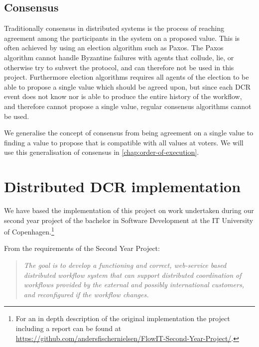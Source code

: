 		
		\subsection{Consensus}
		Traditionally consensus in distributed systems is the process of reaching agreement among the participants in the system on a proposed value. This is often achieved by using an election algorithm such as Paxos\cite{Lamport:1998:PP:279227.279229}. The Paxos algorithm cannot handle Byzantine failures with agents that collude, lie, or otherwise try to subvert the protocol, and can therefore not be used in this project. Furthermore election algorithms requires all agents of the election to be able to propose a single value which should be agreed upon, but since each DCR event does not know nor is able to produce the entire history of the workflow, and therefore cannot propose a single value, regular consensus algorithms cannot be used. 
        
        \newpar We generalise the concept of consensus from being agreement on a single value to finding a value to propose that is compatible with all values at voters. We will use this generalisation of consensus in \autoref{chap:order-of-execution}.
		
	\section{Distributed DCR implementation}
		We have based the implementation of this project on work undertaken during our second year project of the bachelor in Software Development at the IT University of Copenhagen.\footnote{For an in depth description of the original implementation the project including a report can be found at \url{https://github.com/andersfischernielsen/FlowIT-Second-Year-Project/}.}
		
		\newpar From the requirements of the Second Year Project:
		
		\begin{quotation}
			\noindent\textit{The goal is to develop a functioning and correct, web-service based distributed workflow system that can support distributed coordination of workflows provided by the external and possibly international customers, and reconfigured if the workflow changes.}
		\end{quotation}
		
